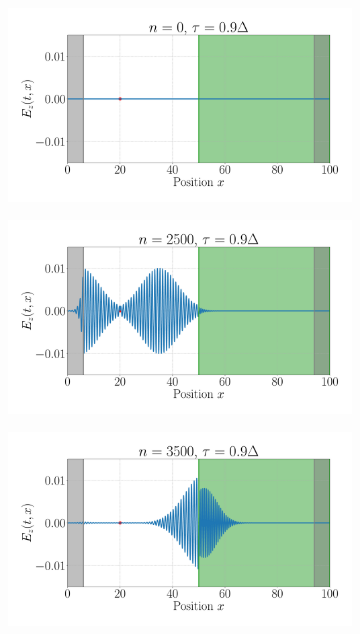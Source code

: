 \documentclass[11pt, A4paper]{article}
\begin{document}
\begin{figure}[h!]
     \begin{subfigure}[h]{0.499\textwidth}
         \centering
         \includegraphics[width=\textwidth]{Plots/maxwell_tau0.9_thickglass_nmax0.pdf}
         \caption{}
         \label{fig: thick_t0_tau09}
     \end{subfigure}
     \begin{subfigure}[h]{0.499\textwidth}
         \centering
         \includegraphics[width=\textwidth]{Plots/maxwell_tau0.9_thickglass_nmax2500.pdf}
         \caption{}
         \label{fig: thick_t40_tau09}
     \end{subfigure}
     \begin{subfigure}[h]{0.499\textwidth}
         \centering
         \includegraphics[width=\textwidth]{Plots/maxwell_tau0.9_thickglass_nmax3500.pdf}

\end{subfigure}
\end{figure}
\end{document}
